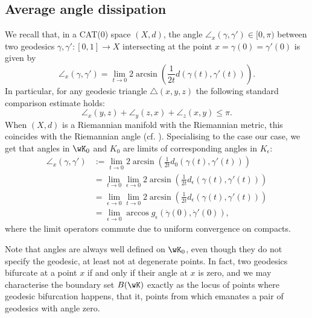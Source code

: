 \documentclass[reqno,11pt]{amsart}
\begin{document}
\subsection{Average angle dissipation}
    We recall that, in a CAT(0) space \((X, d)\), the angle \(\angle_x(\gamma, \gamma') \in [0, \pi)\) between two geodesics \(\gamma, \gamma'\colon [0,1] \to X\) intersecting at the point \(x = \gamma(0) = \gamma'(0)\) is given by
    \[
        \angle_x(\gamma, \gamma') = \lim_{t\to 0} 2\arcsin{\left(\frac{1}{2t}d(\gamma(t), \gamma'(t))\right)}.
    \]
    In particular, for any geodesic triangle \(\triangle(x,y,z)\) the following standard comparison estimate holds:
    \begin{equation}\label{eq:GB_estimate_subs}   
        \angle_x(y,z) + \angle_y(z,x) + \angle_z(x,y) \leq \pi.
    \end{equation}
    When \((X,d)\) is a Riemannian manifold with the Riemannian metric, this coincides with the Riemannian angle (cf. \cite[Corollary II.1A.7]{bridson2011metric}).
    Specialising to the case our case, we get that angles in \(\wK_0\) and \(K_0\) are limits of corresponding angles in \(K_\epsilon\):
    \begin{equation*}
    \begin{split}
        \angle_x(\gamma, \gamma') &:= \lim_{t\to 0} 2\arcsin{\left(\frac{1}{2t}d_0(\gamma(t), \gamma'(t))\right)} \\
                                    & = \lim_{t\to 0} \lim_{\epsilon \to 0}2\arcsin{\left(\frac{1}{2t}d_\epsilon(\gamma(t), \gamma'(t))\right)} \\
                                    & = \lim_{\epsilon \to 0} \lim_{t\to 0} 2\arcsin{\left(\frac{1}{2t}d_\epsilon(\gamma(t), \gamma'(t))\right)} \\
                                    & = \lim_{\epsilon \to 0}\arccos{g_\epsilon(\dot\gamma(0), \dot\gamma'(0))},
    \end{split}
    \end{equation*}
    where the limit operators commute due to uniform convergence on compacts.
    \begin{remark}
        Note that angles are always well defined on \(\wK_0\), even though they do not specify the geodesic, at least not at degenerate points.
        In fact, two geodesics bifurcate at a point \(x\) if and only if their angle at \(x\) is zero, and we may characterise the boundary set \(B(\wK)\) exactly as the locus of points where geodesic bifurcation happens, that it, points from which emanates a pair of geodesics with angle zero.
    \end{remark}
\end{document}
